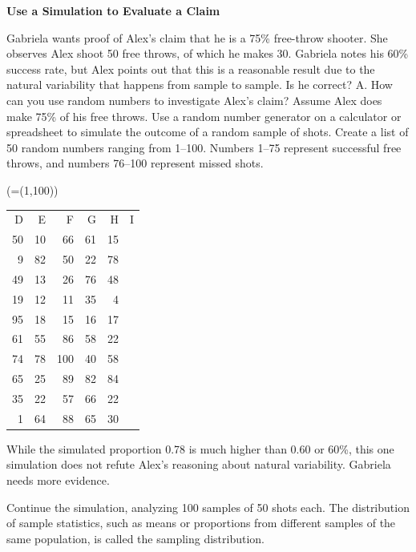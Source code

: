 \documentclass{article}
\newenvironment{example}[1]{}{}         %
\newcommand{\answer}[1]{}               %
\newcommand{\te}[1]{}                   %
\begin{document}
\begin{example}{3}
\textbf{Use a Simulation to Evaluate a Claim}
\te{CONCEPTUAL UNDERSTANDING}
Gabriela wants proof of Alex's claim that he is a 75\% free-throw shooter. She observes Alex shoot 50 free throws, of which he makes 30. Gabriela notes his 60\% success rate, but Alex points out that this is a reasonable result due to the natural variability that happens from sample to sample. Is he correct?
A. How can you use random numbers to investigate Alex's claim?
Assume Alex does make 75\% of his free throws. Use a random number generator on a calculator or spreadsheet to simulate the outcome of a random sample of shots.
Create a list of 50 random numbers ranging from 1–100. Numbers 1–75 represent successful free throws, and numbers 76–100 represent missed shots.
\te{USE APPROPRIATE TOOLS A random number generator allows you to generate many samples based on a possible population parameter. These samples will provide a collection of statistics with natural variability. You can evaluate a statistic by comparing it to this collection.}
(=(1,100))
\begin{tabular}{rrrrrr}
D & E & F & G & H & I \\
50 & 10 & 66 & 61 & 15 & \\
9 & 82 & 50 & 22 & 78 & \\
49 & 13 & 26 & 76 & 48 & \\
19 & 12 & 11 & 35 & 4 & \\
95 & 18 & 15 & 16 & 17 & \\
61 & 55 & 86 & 58 & 22 & \\
74 & 78 & 100 & 40 & 58 & \\
65 & 25 & 89 & 82 & 84 & \\
35 & 22 & 57 & 66 & 22 & \\
1 & 64 & 88 & 65 & 30 & \\
\end{tabular}
\te{Numbers 1–75 are red and 76–100 blue in the spreadsheet. Callout: A formula like this generates a random number between 1 and 100.}
\te{Callout: In this sample, 39 out of 50 shots, or 0.78, are successful.}
While the simulated proportion 0.78 is much higher than 0.60 or 60\%, this one simulation does not refute Alex's reasoning about natural variability. Gabriela needs more evidence.
\answer{A. Simulate 50 shots with random numbers 1–100, using 1–75 for successes; the shown sample has 39 successes, or 0.78, and more evidence is needed.}
Continue the simulation, analyzing 100 samples of 50 shots each. The distribution of sample statistics, such as means or proportions from different samples of the same population, is called the sampling distribution.

\end{example}
\end{document}
